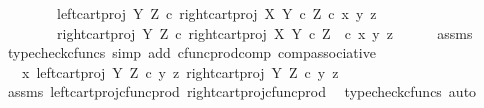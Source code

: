 \begin{isabellebody}
\ \ \ \ \ \ \ \ left{\isacharunderscore}{\kern0pt}cart{\isacharunderscore}{\kern0pt}proj\ Y\ Z\ {\isasymcirc}\isactrlsub c\ right{\isacharunderscore}{\kern0pt}cart{\isacharunderscore}{\kern0pt}proj\ X\ {\isacharparenleft}{\kern0pt}Y\ {\isasymtimes}\isactrlsub c\ Z{\isacharparenright}{\kern0pt}\ {\isasymcirc}\isactrlsub c\ {\isasymlangle}x{\isacharcomma}{\kern0pt}\ {\isasymlangle}y{\isacharcomma}{\kern0pt}\ z{\isasymrangle}{\isasymrangle}{\isasymrangle}{\isacharcomma}{\kern0pt}\isanewline
\ \ \ \ \ \ \ \ right{\isacharunderscore}{\kern0pt}cart{\isacharunderscore}{\kern0pt}proj\ Y\ Z\ {\isasymcirc}\isactrlsub c\ right{\isacharunderscore}{\kern0pt}cart{\isacharunderscore}{\kern0pt}proj\ X\ {\isacharparenleft}{\kern0pt}Y\ {\isasymtimes}\isactrlsub c\ Z{\isacharparenright}{\kern0pt}\ \ {\isasymcirc}\isactrlsub c\ {\isasymlangle}x{\isacharcomma}{\kern0pt}\ {\isasymlangle}y{\isacharcomma}{\kern0pt}\ z{\isasymrangle}{\isasymrangle}{\isasymrangle}{\isachardoublequoteclose}\isanewline
\ \ \ \ \isamarkupfalse%
\ assms\ \isamarkupfalse%
\ {\isacharparenleft}{\kern0pt}typecheck{\isacharunderscore}{\kern0pt}cfuncs{\isacharcomma}{\kern0pt}\ simp\ add{\isacharcolon}{\kern0pt}\ cfunc{\isacharunderscore}{\kern0pt}prod{\isacharunderscore}{\kern0pt}comp\ comp{\isacharunderscore}{\kern0pt}associative{}{\isacharparenright}{\kern0pt}\isanewline
\ \ \isamarkupfalse%
\ \isamarkupfalse%
\ {\isachardoublequoteopen}{\isachardot}{\kern0pt}{\isachardot}{\kern0pt}{\isachardot}{\kern0pt}\ {\isacharequal}{\kern0pt}\ {\isasymlangle}{\isasymlangle}x{\isacharcomma}{\kern0pt}\ left{\isacharunderscore}{\kern0pt}cart{\isacharunderscore}{\kern0pt}proj\ Y\ Z\ {\isasymcirc}\isactrlsub c\ {\isasymlangle}y{\isacharcomma}{\kern0pt}\ z{\isasymrangle}{\isasymrangle}{\isacharcomma}{\kern0pt}\ right{\isacharunderscore}{\kern0pt}cart{\isacharunderscore}{\kern0pt}proj\ Y\ Z\ {\isasymcirc}\isactrlsub c\ {\isasymlangle}y{\isacharcomma}{\kern0pt}\ z{\isasymrangle}{\isasymrangle}{\isachardoublequoteclose}\isanewline
\ \ \ \ \isamarkupfalse%
\ assms\ left{\isacharunderscore}{\kern0pt}cart{\isacharunderscore}{\kern0pt}proj{\isacharunderscore}{\kern0pt}cfunc{\isacharunderscore}{\kern0pt}prod\ right{\isacharunderscore}{\kern0pt}cart{\isacharunderscore}{\kern0pt}proj{\isacharunderscore}{\kern0pt}cfunc{\isacharunderscore}{\kern0pt}prod\ \isamarkupfalse%
\ {\isacharparenleft}{\kern0pt}typecheck{\isacharunderscore}{\kern0pt}cfuncs{\isacharcomma}{\kern0pt}\ auto{\isacharparenright}{\kern0pt}\isanewline
\ \ \isamarkupfalse%

\end{isabellebody}
